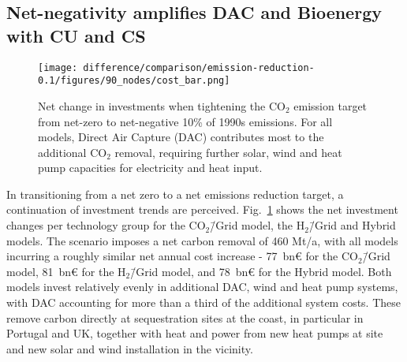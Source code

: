 \documentclass[twocolumn]{article}
\newcommand{\COtwo}{CO$_2$}
\newcommand{\Hgrid}{H$_2$\=/Grid}
\newcommand{\modCO}{CO$_2$\=/Grid model}
\newcommand{\modH}{H$_2$\=/Grid model}
\newcommand{\modHybrid}{Hybrid model}
\newcommand{\carbon}{CO$_2$}
\newcommand{\carbonmodel}{CO$_2$\=/Grid model}
\begin{document}
\subsection*{Net-negativity amplifies DAC and Bioenergy with CU and CS}\label{subsec:NN}

\begin{figure}[htb!]
    \centering
    \texttt{[image: difference/comparison/emission-reduction-0.1/figures/90\_nodes/cost\_bar.png]}
    \caption[short]{Net change in investments when tightening the \COtwo{} emission target from net-zero to net-negative 10\% of 1990s emissions. For all models, Direct Air Capture (DAC) contributes most to the additional \carbon{} removal, requiring further solar, wind and heat pump capacities for electricity and heat input.}
    \label{fig:net-negative_cost_bar}
\end{figure}






In transitioning from a net zero to a net emissions reduction target, a continuation of investment trends are perceived. Fig.~\ref{fig:net-negative_cost_bar} shows the net investment changes per technology group for the \carbonmodel, the \Hgrid{} and \modHybrid{}s. The scenario imposes a net carbon removal of 460 Mt/a, with all models incurring a roughly similar net annual cost increase - 77~bn€ for the \modCO{}, 81~bn€ for the \modH{}, and 78~bn€ for the \modHybrid{}. Both models invest relatively evenly in additional DAC, wind and heat pump systems, with DAC accounting for more than a third of the additional system costs. These remove carbon directly at sequestration sites at the coast, in particular in Portugal and UK, together with heat and power from new heat pumps at site and new solar and wind installation in the vicinity.
\end{document}
